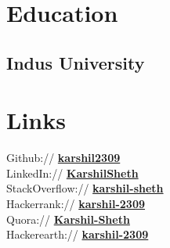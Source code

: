 \documentclass[]{deedy-resume-openfont}
\begin{document}
%
%
\lastupdated

%
%

%
%

\begin{minipage}[t]{0.33\textwidth} 


\section{Education} 

\subsection{Indus University}
\sectionsep


\section{Links} 
Github:// \href{https://github.com/karshil2309}{\bf karshil2309} \\
LinkedIn://  \href{https://www.linkedin.com/in/karshilsheth}{\bf KarshilSheth} \\
StackOverflow://  \href{https://stackoverflow.com/users/7986351/karshil-sheth}{\bf karshil-sheth} \\
Hackerrank://  \href{https://www.hackerrank.com/karshil_2309}{\bf karshil-2309} \\
Quora://  \href{https://www.quora.com/Karshil-Sheth}{\bf Karshil-Sheth}\\
Hackerearth://  \href{https://www.hackerearth.com/@karshil_2309}{\bf karshil-2309}\\


\end{minipage}
\end{document}
